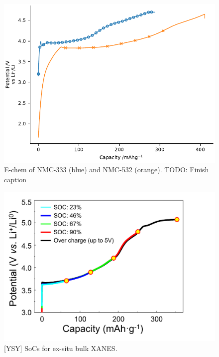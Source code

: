 \documentclass{article}
\begin{document}
\begin{figure}
  \includegraphics{figures/nmc_echem.pdf}
  \caption{E-chem of NMC-333 (blue) and NMC-532 (orange). TODO: Finish caption}
\end{figure}

\begin{figure}
  \includegraphics[width=\textwidth]{figures/ys-echem.png}
  \caption{[YSY] SoCs for ex-situ bulk XANES.}
\end{figure}
\end{document}
